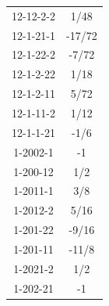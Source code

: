 \begin{tabular}[t]{|cc|}
12-12-2-2 &  1/48\\
12-1-21-1 &  -17/72\\
12-1-22-2 &  -7/72\\
12-1-2-22 &  1/18\\
12-1-2-11 &  5/72\\
12-1-11-2 &  1/12\\
12-1-1-21 &  -1/6\\
1-2002-1 &  -1\\
1-200-12 &  1/2\\
1-2011-1 &  3/8\\
1-2012-2 &  5/16\\
1-201-22 &  -9/16\\
1-201-11 &  -11/8\\
1-2021-2 &  1/2\\
1-202-21 &  -1\\
\hline
\end{tabular}
